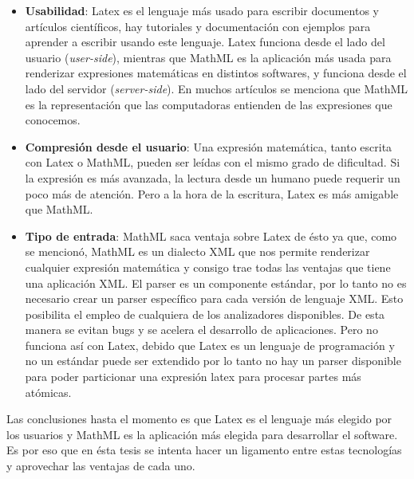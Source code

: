 \begin{itemize}
\item \textbf{Usabilidad}: Latex es el lenguaje más usado para escribir documentos y artículos científicos, hay tutoriales y documentación con ejemplos para aprender a escribir usando este lenguaje. Latex funciona desde el lado del usuario (\textit{user-side}), mientras que MathML es la aplicación más usada para renderizar expresiones matemáticas en distintos softwares, y funciona desde el lado del servidor (\textit{server-side}). En muchos artículos se menciona que MathML es la representación que las computadoras entienden de las expresiones que conocemos.
\item \textbf{Compresión desde el usuario}: Una expresión matemática, tanto escrita con Latex o MathML, pueden ser leídas con el mismo grado de dificultad. Si la expresión es más avanzada, la lectura desde un humano puede requerir un poco más de atención. Pero a la hora de la escritura, Latex es más amigable que MathML.
\item \textbf{Tipo de entrada}: MathML saca ventaja sobre Latex de ésto ya que, como se mencionó, MathML es un dialecto XML que nos permite renderizar cualquier expresión matemática y consigo trae todas las ventajas que tiene una aplicación XML. El parser es un componente estándar, por lo tanto no es necesario crear un parser específico para cada versión de lenguaje XML. Esto posibilita el empleo de cualquiera de los analizadores disponibles. De esta manera se evitan bugs y se acelera el desarrollo de aplicaciones. Pero no funciona así con Latex, debido que Latex es un lenguaje de programación y no un estándar puede ser extendido por lo tanto no hay un parser disponible para poder particionar una expresión latex para procesar partes más atómicas.
\end{itemize}

Las conclusiones hasta el momento es que Latex es el lenguaje más elegido por los usuarios y MathML es la aplicación más elegida para desarrollar el software. Es por eso que en ésta tesis se intenta hacer un ligamento entre estas tecnologías y aprovechar las ventajas de cada uno.